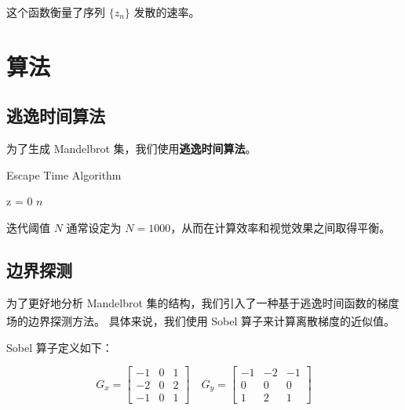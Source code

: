 \documentclass[11pt]{article}
\begin{document}
    这个函数衡量了序列 $\{z_n\}$ 发散的速率。


    \section{算法}\label{sec:algorithm}

    \subsection{逃逸时间算法}\label{subsec:escape_time_algorithm}

    为了生成 Mandelbrot 集，我们使用\textbf{逃逸时间算法}。

    \begin{algorithm}[H]
        \SetAlgoLined
        \caption{Escape Time Algorithm}
        \label{alg:escape_time_algorithm}
        z = 0\;
        \Return $n$\;
    \end{algorithm}

    迭代阈值 $N$ 通常设定为 $N = 1000$，从而在计算效率和视觉效果之间取得平衡。

    \subsection{边界探测}\label{subsec:boundary_detection}

    为了更好地分析 Mandelbrot 集的结构，我们引入了一种基于逃逸时间函数的梯度场的边界探测方法。
    具体来说，我们使用 Sobel 算子\textsuperscript{\cite{sobel1968isotropic}}来计算离散梯度的近似值。

    Sobel 算子定义如下：

    \begin{equation}
        \label{eq:sobel_operator}
        G_x = \begin{bmatrix}
                  -1 & 0 & 1 \\
                  -2 & 0 & 2 \\
                  -1 & 0 & 1
        \end{bmatrix}
        \quad
        G_y = \begin{bmatrix}
                  -1 & -2 & -1 \\
                  0  & 0  & 0  \\
                  1  & 2  & 1
        \end{bmatrix}
    \end{equation}
\end{document}
